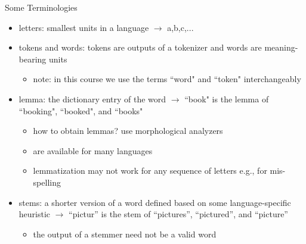 \begin{frame}{Some Terminologies}
    \begin{itemize}
        \item<1-> letters: smallest units in a language $\rightarrow$ a,b,c,...
        \item<2-> tokens and words: tokens are outputs of a tokenizer and words are meaning-bearing units
        \begin{itemize}
            \item note: in this course we use the terms ``word" and ``token" interchangeably 
        \end{itemize}
        \item<3-> lemma: the dictionary entry of the word $\rightarrow$ ``book" is the lemma of ``booking", ``booked", and ``books"
            \begin{itemize}
                \item how to obtain lemmas? use morphological analyzers 
                \item are available for many languages
                \item lemmatization may not work for any sequence of letters e.g., for mis-spelling
            \end{itemize}
            
        \item<4-> stems: a shorter version of a word defined based on some language-specific heuristic $\rightarrow$ ``pictur'' is the stem of ``pictures'', ``pictured'', and ``picture''
        \begin{itemize}
            \item the output of a stemmer need not be a valid word
        \end{itemize}
    \end{itemize}
\end{frame}
